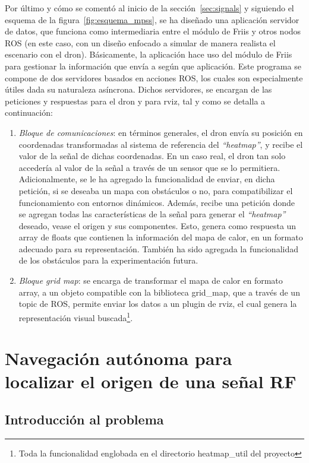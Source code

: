 Por último y cómo se comentó al inicio de la sección~\ref{sec:signals} y siguiendo el esquema de la figura~\ref{fig:esquema_mpss}, se ha diseñado una aplicación servidor de datos, que funciona como intermediaria entre el módulo de Friis y otros nodos \ac{ROS} (en este caso, con un diseño enfocado a simular de manera realista el escenario con el dron). Básicamente, la aplicación hace uso del módulo de Friis para gestionar la información que envía a según que aplicación. Este programa se compone de dos servidores basados en acciones \ac{ROS}, los cuales son especialmente útiles dada su naturaleza asíncrona. Dichos servidores, se encargan de las peticiones y respuestas para el dron y para rviz, tal y como se detalla a continuación:

\begin{enumerate}
	\item \emph{Bloque de comunicaciones}: en términos generales, el dron envía su posición en coordenadas transformadas al sistema de referencia del \emph{``heatmap''}, y recibe el valor de la señal de dichas coordenadas. En un caso real, el dron tan solo accedería al valor de la señal a través de un sensor que se lo permitiera. Adicionalmente, se le ha agregado la funcionalidad de enviar, en dicha petición, si se deseaba un mapa con obstáculos o no, para compatibilizar el funcionamiento con entornos dinámicos. Además, recibe una petición donde se agregan todas las características de la señal para generar el \emph{``heatmap''} deseado, vease el origen y sus componentes. Esto, genera como respuesta un array de floats que contienen la información del mapa de calor, en un formato adecuado para su representación. También ha sido agregada la funcionalidad de los obstáculos para la experimentación futura.
	\item \emph{Bloque grid map}: se encarga de transformar el mapa de calor en formato array, a un objeto compatible con la biblioteca grid\_map, que a través de un topic de \ac{ROS}, permite enviar los datos a un plugin de rviz, el cual genera la representación visual buscada\footnote[3]{Toda la funcionalidad englobada en el directorio heatmap\_util del proyecto}.
\end{enumerate}

\section{Navegación autónoma para localizar el origen de una señal \ac{RF}}
\label{sec:signal_follow}

\subsection{Introducción al problema}
\label{subsec:intro_sf}

